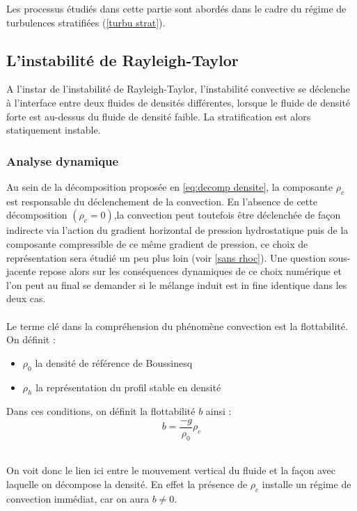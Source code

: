 \documentclass{rapportECC}
\begin{document}
Les processus étudiés dans cette partie sont abordés dans le cadre du régime de turbulences stratifiées (\ref{turbu strat}).
\subsection{L'instabilité de Rayleigh-Taylor}
\label{RT}
A l'instar de l'instabilité de Rayleigh-Taylor, l'instabilité convective se déclenche à l'interface entre deux fluides de densités différentes, lorsque le fluide de densité forte est au-dessus du fluide de densité faible. La stratification est alors statiquement instable. \\ 


\subsubsection{Analyse dynamique}


Au sein de la décomposition proposée en \eqref{eq:decomp densite}, la composante $\rho_c$ est responsable du déclenchement de la convection. 
En l'absence de cette décomposition $(\rho_c=0)$,la convection peut toutefois être déclenchée de façon indirecte via l'action du gradient horizontal de pression hydrostatique puis de la composante compressible de ce même gradient de pression, ce choix de représentation sera étudié un peu plus loin (voir \ref{sans rhoc}). Une question sous-jacente repose alors sur les conséquences dynamiques de ce choix numérique et l'on peut au final se demander si le mélange induit est in fine identique dans les deux cas.\\


\\
\vspace{0.5 cm}
Le terme clé dans la compréhension du phénomène convection est la flottabilité. \\
On définit :
\begin{itemize}
    \item $\rho_0$ la densité de référence de Boussinesq
    \item $\rho_h$ la représentation du profil stable en densité
\end{itemize}
Dans ces conditions, on définit la flottabilité $b$ ainsi :
\begin{equation}
    b = \dfrac{-g}{\rho_0}\rho_c
\end{equation}

\\
On voit donc le lien ici entre le mouvement vertical du fluide et la façon avec laquelle on décompose la densité. En effet la présence de $\rho_c$ installe un régime de convection immédiat, car on aura $b \neq 0$.\\
\end{document}
